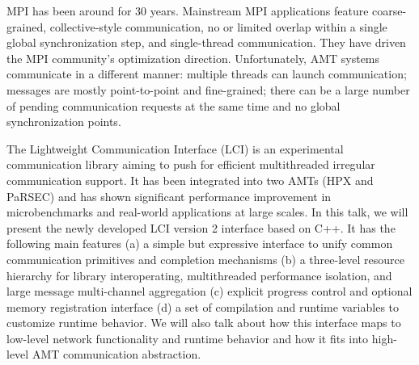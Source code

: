 MPI has been around for 30 years. Mainstream MPI applications feature coarse-grained, collective-style communication, no or limited overlap within a single global synchronization step, and single-thread communication. They have driven the MPI community’s optimization direction. Unfortunately, AMT systems communicate in a different manner: multiple threads can launch communication; messages are mostly point-to-point and fine-grained; there can be a large number of pending communication requests at the same time and no global synchronization points.

The Lightweight Communication Interface (LCI) is an experimental communication library aiming to push for efficient multithreaded irregular communication support. It has been integrated into two AMTs (HPX and PaRSEC) and has shown significant performance improvement in microbenchmarks and real-world applications at large scales. In this talk, we will present the newly developed LCI version 2 interface based on C++. It has the following main features (a) a simple but expressive interface to unify common communication primitives and completion mechanisms (b) a three-level resource hierarchy for library interoperating, multithreaded performance isolation, and large message multi-channel aggregation (c) explicit progress control and optional memory registration interface (d) a set of compilation and runtime variables to customize runtime behavior. We will also talk about how this interface maps to low-level network functionality and runtime behavior and how it fits into high-level AMT communication abstraction.
